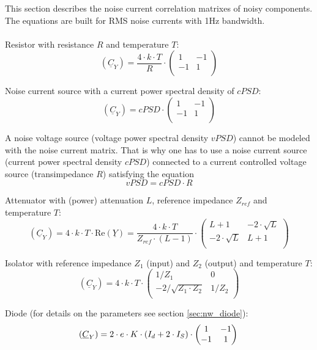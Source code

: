 This section describes the noise current correlation matrixes of
noisy components. The equations are built for RMS noise currents
with 1Hz bandwidth.\\ \\

Resistor with resistance $R$ and temperature $T$:
\begin{equation}
(\underline{C}_Y) = \frac{4\cdot k\cdot T}{R} \cdot
\begin{pmatrix}
 1 & -1 \\
-1 &  1 \\
\end{pmatrix}
\end{equation}

Noise current source with a current power spectral density of
$cPSD$:
\begin{equation}
(\underline{C}_Y) = cPSD \cdot
\begin{pmatrix}
 1 & -1 \\
-1 &  1 \\
\end{pmatrix}
\end{equation}

A noise voltage source (voltage power spectral density $vPSD$)
cannot be modeled with the noise current
matrix. That is why one has to use a noise current source
(current power spectral density $cPSD$) connected to a current
controlled voltage source (transimpedance $R$) satisfying the
equation
\begin{equation}
vPSD = cPSD \cdot R
\end{equation}

Attenuator with (power) attenuation $L$, reference impedance
$Z_{ref}$ and temperature $T$:
\begin{equation}
(\underline{C}_Y) = 4\cdot k\cdot T\cdot \text{Re}(\underline{Y})
 = \frac{4\cdot k\cdot T}{Z_{ref}\cdot (L-1)} \cdot
\begin{pmatrix}
 L+1            & -2\cdot\sqrt{L} \\
-2\cdot\sqrt{L} &  L+1 \\
\end{pmatrix}
\end{equation}

Isolator with reference impedance $Z_1$ (input) and $Z_2$ (output)
and temperature $T$:
\begin{equation}
(\underline{C}_Y) = 4\cdot k\cdot T\cdot
\begin{pmatrix}
 1/Z_1                 & 0 \\
-2/\sqrt{Z_1\cdot Z_2} &  1/Z_2 \\
\end{pmatrix}
\end{equation}

Diode (for details on the parameters see section \ref{sec:nw_diode}):
\begin{equation}
(\underline{C}_Y)
 = 2\cdot e\cdot K\cdot \left(I_{d} + 2\cdot I_{S}\right)\cdot
\begin{pmatrix}
   1 & -1\\
  -1 &  1\\
\end{pmatrix}\\
\end{equation}
